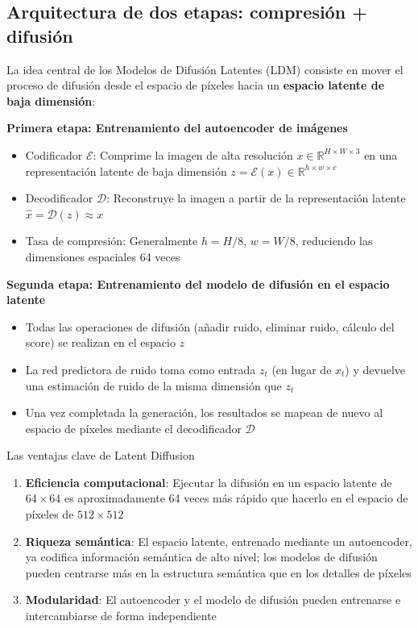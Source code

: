 \documentclass[a4paper]{article}
\begin{document}
\subsection{Arquitectura de dos etapas: compresión + difusión}

La idea central de los Modelos de Difusión Latentes (LDM) consiste en mover el proceso de difusión desde el espacio de píxeles hacia un \textbf{espacio latente de baja dimensión}:

\textbf{Primera etapa: Entrenamiento del autoencoder de imágenes}
\begin{itemize}
    \item Codificador $\mathcal{E}$: Comprime la imagen de alta resolución $x \in \mathbb{R}^{H\times W\times 3}$ en una representación latente de baja dimensión $z = \mathcal{E}(x) \in \mathbb{R}^{h\times w\times c}$
    \item Decodificador $\mathcal{D}$: Reconstruye la imagen a partir de la representación latente $\hat{x} = \mathcal{D}(z) \approx x$
    \item Tasa de compresión: Generalmente $h = H/8$, $w = W/8$, reduciendo las dimensiones espaciales 64 veces
\end{itemize}

\textbf{Segunda etapa: Entrenamiento del modelo de difusión en el espacio latente}
\begin{itemize}
    \item Todas las operaciones de difusión (añadir ruido, eliminar ruido, cálculo del score) se realizan en el espacio $z$
    \item La red predictora de ruido toma como entrada $z_t$ (en lugar de $x_t$) y devuelve una estimación de ruido de la misma dimensión que $z_t$
    \item Una vez completada la generación, los resultados se mapean de nuevo al espacio de píxeles mediante el decodificador $\mathcal{D}$
\end{itemize}

\begin{importantbox}{Las ventajas clave de Latent Diffusion}
\begin{enumerate}
    \item \textbf{Eficiencia computacional}: Ejecutar la difusión en un espacio latente de $64\times64$ es aproximadamente 64 veces más rápido que hacerlo en el espacio de píxeles de $512\times512$
    \item \textbf{Riqueza semántica}: El espacio latente, entrenado mediante un autoencoder, ya codifica información semántica de alto nivel; los modelos de difusión pueden centrarse más en la estructura semántica que en los detalles de píxeles
    \item \textbf{Modularidad}: El autoencoder y el modelo de difusión pueden entrenarse e intercambiarse de forma independiente
\end{enumerate}
\end{importantbox}
\end{document}
